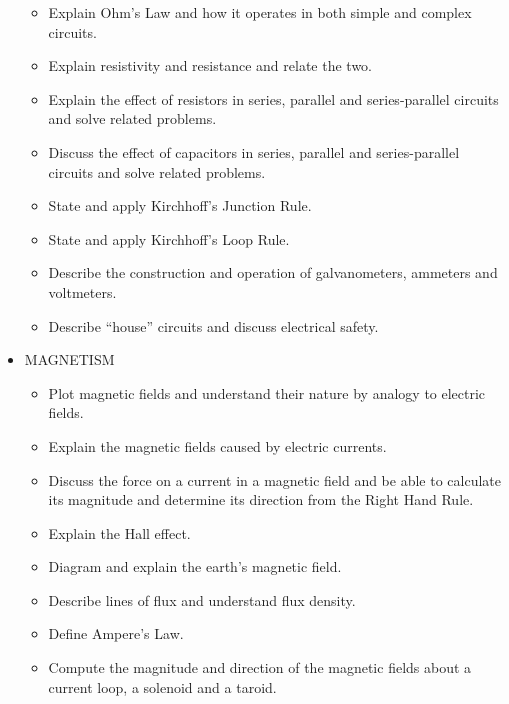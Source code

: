 \documentclass{article}
\begin{document}
\begin{itemize}
\begin{itemize}
\item Explain Ohm's Law and how it operates in both simple and complex circuits.

\item Explain resistivity and resistance and relate the two.

\item Explain the effect of resistors in series, parallel and series-parallel circuits and solve related problems.

\item Discuss the effect of capacitors in series, parallel and series-parallel circuits and solve related problems.

\item State and apply Kirchhoff's Junction Rule.

\item State and apply Kirchhoff's Loop Rule.

\item Describe the construction and operation of galvanometers, ammeters and voltmeters.

\item Describe ``house'' circuits and discuss electrical safety.

\end{itemize}

\item MAGNETISM
%
\begin{itemize}

\item Plot magnetic fields and understand their nature by analogy to electric fields.

\item Explain the magnetic fields caused by electric currents.

\item Discuss the force on a current in a magnetic field and be able to calculate its magnitude and determine its direction from the Right Hand Rule.

\item Explain the Hall effect.

\item Diagram and explain the earth's magnetic field.

\item Describe lines of flux and understand flux density.

\item Define Ampere's Law.

\item Compute the magnitude and direction of the magnetic fields about a current loop, a solenoid and a taroid.


\end{itemize}
\end{itemize}
\end{document}
